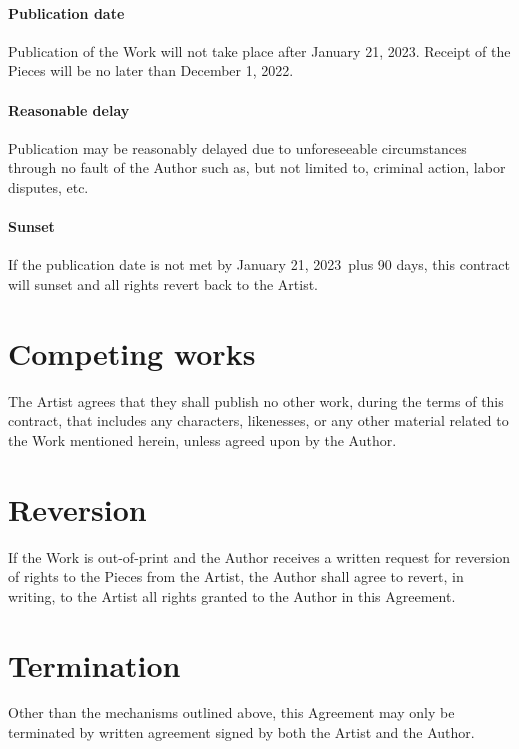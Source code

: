\documentclass[12pt,letterpaper]{article}
\def\PublicationDate{January 21, 2023}
\begin{document}
\paragraph{Publication date}

Publication of the Work will not take place after \PublicationDate. Receipt of the Pieces will be no later than December 1, 2022.

\paragraph{Reasonable delay}

Publication may be reasonably delayed due to unforeseeable circumstances through no fault of the Author such as, but not limited to, criminal action, labor disputes, etc.

\paragraph{Sunset}

If the publication date is not met by \PublicationDate\ plus 90 days, this contract will sunset and all rights revert back to the Artist.

\section{Competing works}

The Artist agrees that they shall publish no other work, during the terms of this contract, that includes any characters, likenesses, or any other material related to the Work mentioned herein, unless agreed upon by the Author.

\section{Reversion}

If the Work is out-of-print and the Author receives a written request for reversion of rights to the Pieces from the Artist, the Author shall agree to revert, in writing, to the Artist all rights granted to the Author in this Agreement.

\section{Termination}

Other than the mechanisms outlined above, this Agreement may only be terminated by written agreement signed by both the Artist and the Author.
\end{document}
